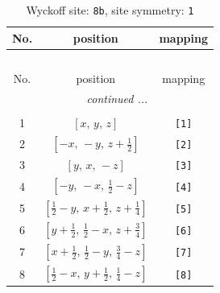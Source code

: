 \documentclass[fleqn,8pt]{jsarticle}
\begin{document}
\begin{longtable}{ccc}
\caption{Wyckoff site: {\tt 8b}, site symmetry: {\tt 1}}
 \\
 \hline \hline
No. & position & mapping \\ \hline \endfirsthead

\multicolumn{2}{l}{\tablename\ \thetable{}} \\
 \hline \hline
No. & position & mapping \\ \hline \endhead

 \hline \hline
\multicolumn{2}{r}{\footnotesize\it continued ...} \\ \endfoot

 \hline \hline
\multicolumn{2}{r}{} \\ \endlastfoot

1 & $\left[ x,\, y,\, z \right]$ & {\tt [1]} \\ \hline
2 & $\left[ - x,\, - y,\, z + \frac{1}{2} \right]$ & {\tt [2]} \\ \hline
3 & $\left[ y,\, x,\, - z \right]$ & {\tt [3]} \\ \hline
4 & $\left[ - y,\, - x,\, \frac{1}{2} - z \right]$ & {\tt [4]} \\ \hline
5 & $\left[ \frac{1}{2} - y,\, x + \frac{1}{2},\, z + \frac{1}{4} \right]$ & {\tt [5]} \\ \hline
6 & $\left[ y + \frac{1}{2},\, \frac{1}{2} - x,\, z + \frac{3}{4} \right]$ & {\tt [6]} \\ \hline
7 & $\left[ x + \frac{1}{2},\, \frac{1}{2} - y,\, \frac{3}{4} - z \right]$ & {\tt [7]} \\ \hline
8 & $\left[ \frac{1}{2} - x,\, y + \frac{1}{2},\, \frac{1}{4} - z \right]$ & {\tt [8]} \\
\end{longtable}
\end{document}
